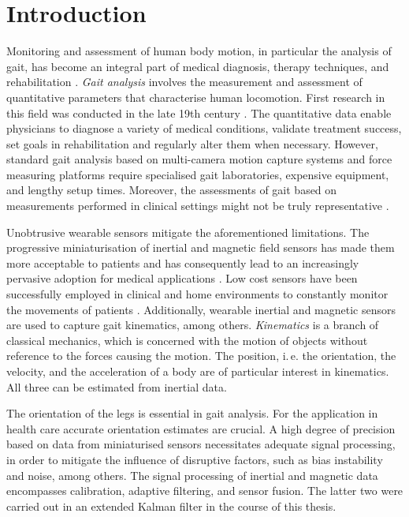 \chapter{Introduction}
\label{ch:Introduction}

Monitoring and assessment of human body motion, in particular the analysis of gait, has become an integral part of medical diagnosis, therapy techniques, and rehabilitation \cite{tao_gait_2012}. \emph{Gait analysis} involves the measurement and assessment of quantitative parameters that characterise human locomotion. First research in this field was conducted in the late 19th century \cite{tao_gait_2012}. The quantitative data enable physicians to diagnose a variety of medical conditions, validate treatment success, set goals in rehabilitation and regularly alter them when necessary. However, standard gait analysis based on multi-camera motion capture systems and force measuring platforms require specialised gait laboratories, expensive equipment, and lengthy setup times. Moreover, the assessments of gait based on measurements performed in clinical settings might not be truly representative \cite{bonato_advances_2005}.

Unobtrusive wearable sensors mitigate the aforementioned limitations. The progressive miniaturisation of inertial and magnetic field sensors has made them more acceptable to patients and has consequently lead to an increasingly pervasive adoption for medical applications \cite{wee_soon_ambulatory_2008}. Low cost sensors have been successfully employed in clinical and home environments to constantly monitor the movements of patients \cite{godfrey_direct_2008}. Additionally, wearable inertial and magnetic sensors are used to capture gait kinematics, among others. \emph{Kinematics} is a branch of classical mechanics, which is concerned with the motion of objects without reference to the forces causing the motion. The position, i.\,e. the orientation, the velocity, and the acceleration of a body are of particular interest in kinematics. All three can be estimated from inertial data.

The orientation of the legs is essential in gait analysis. For the application in health care accurate orientation estimates are crucial. A high degree of precision based on data from miniaturised sensors necessitates adequate signal processing, in order to mitigate the influence of disruptive factors, such as bias instability and noise, among others. The signal processing of inertial and magnetic data encompasses calibration, adaptive filtering, and sensor fusion. The latter two were carried out in an extended Kalman filter in the course of this thesis.

